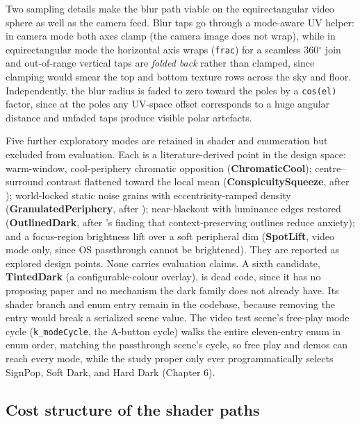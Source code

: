 Two sampling details make the blur path viable on the equirectangular video sphere as well as the
camera feed. Blur taps go through a mode-aware UV helper: in camera mode both axes clamp (the camera
image does not wrap), while in equirectangular mode the horizontal axis wraps (\verb|frac|) for a seamless
360$^{\circ}$ join and out-of-range vertical taps are \textit{folded back} rather than clamped, since clamping
would smear the top and bottom texture rows across the sky and floor. Independently, the blur radius
is faded to zero toward the poles by a \verb|cos(el)| factor, since at the poles any UV-space offset
corresponds to a huge angular distance and unfaded taps produce visible polar artefacts.

Five further exploratory modes are retained in shader and enumeration but excluded from evaluation.
Each is a literature-derived point in the design space: warm-window, cool-periphery chromatic
opposition (\textbf{ChromaticCool}); centre–surround contrast flattened toward the local mean
(\textbf{ConspicuitySqueeze}, after \citealp{veas2011}); world-locked static noise grains with
eccentricity-ramped density (\textbf{GranulatedPeriphery}, after \citealp{cao2021}); near-blackout with
luminance edges restored (\textbf{OutlinedDark}, after \citealp{cheng2022}'s finding that
context-preserving outlines reduce anxiety); and a focus-region brightness lift over a soft
peripheral dim (\textbf{SpotLift}, video mode only, since OS passthrough cannot be brightened). They
are reported as explored design points. None carries evaluation claims. A sixth candidate,
\textbf{TintedDark} (a configurable-colour overlay), is dead code, since it has no proposing paper and
no mechanism the dark family does not already have. Its shader branch and enum entry remain in the
codebase, because removing the entry would break a serialized scene value. The video test scene's
free-play mode cycle (\verb|k_modeCycle|, the A-button cycle) walks the entire eleven-entry enum in
enum order, matching the passthrough scene's cycle, so free play and demos can reach every mode,
while the study proper only ever programmatically selects SignPop, Soft Dark, and Hard Dark
(Chapter 6).

\subsection{Cost structure of the shader paths}

